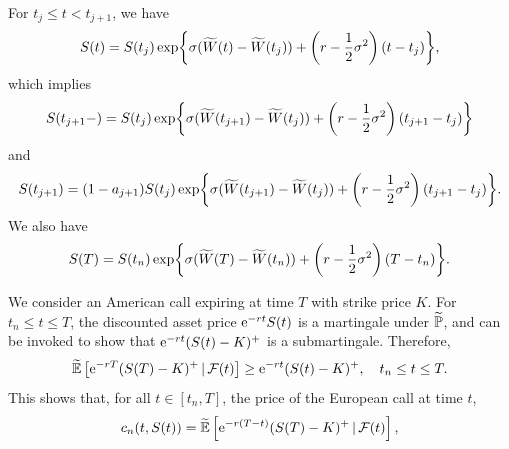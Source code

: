 For $t_j \le t < t_{j+1}$, we have
\begin{equation}
	S(t) = S(t_j) \exp \set[\bigg]{ \sigma (\widetilde{W}(t) - \widetilde{W}(t_j)) + \left( r - \frac{1}{2}\sigma^2 \right) (t - t_j) }, \label{eq:AssetPriceDynamics}
\end{equation}
which implies
\begin{equation}
	S(t_{j+1}-) = S(t_j) \exp \set[\bigg]{ \sigma (\widetilde{W}(t_{j+1}) - \widetilde{W}(t_j)) + \left( r - \frac{1}{2}\sigma^2 \right) (t_{j+1} - t_j) } \label{eq:AssetPricePreDividend}
\end{equation}
and
\begin{equation}
	S(t_{j+1}) = (1 - a_{j+1})S(t_j) \exp \set[\bigg]{ \sigma (\widetilde{W}(t_{j+1}) - \widetilde{W}(t_j)) + \left( r - \frac{1}{2}\sigma^2 \right) (t_{j+1} - t_j) }. \label{eq:AssetPricePostDividend}
\end{equation}
We also have
\begin{equation}
	S(T) = S(t_n) \exp \set[\bigg]{ \sigma (\widetilde{W}(T) - \widetilde{W}(t_n)) + \left( r - \frac{1}{2}\sigma^2 \right) (T - t_n) }. \label{eq:TerminalAssetPrice}
\end{equation}

We consider an American call expiring at time $T$ with strike price $K$. For $t_n \le t \le T$, the discounted asset price $\e^{-rt}S(t)$ is a martingale under $\widetilde{\Prob}$, and  can be invoked to show that $\e^{-rt}(S(t) - K)^+$ is a submartingale. Therefore,
\begin{equation}
	\widetilde{\E} \left[ \e^{-rT} (S(T) - K)^+ \gvn \cF(t) \right] \ge \e^{-rt} (S(t) - K)^+, \quad t_n \le t \le T. \label{eq:SubmartingaleProperty}
\end{equation}
This shows that, for all $t \in [t_n, T]$, the price of the European call at time $t$,
\begin{equation}
	c_n(t, S(t)) = \widetilde{\E} \left[ \e^{-r(T-t)} (S(T) - K)^+ \gvn \cF(t) \right], \label{eq:EuropeanCallValue}
\end{equation}

